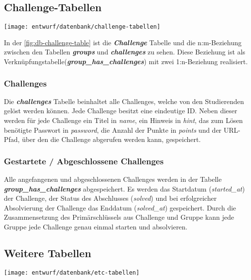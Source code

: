 \clearpage
\subsection{Challenge-Tabellen}
\begin{center}
	\texttt{[image: entwurf/datenbank/challenge-tabellen]}
	\label{fig:db-challenge-table}
\end{center}
In der \autoref{fig:db-challenge-table} ist die \textbf{\textit{Challenge}} Tabelle und die n:m-Beziehung zwischen den Tabellen \textbf{\textit{groups}} und \textbf{\textit{challenges}} zu sehen. Diese Beziehung ist als Verknüpfungstabelle\linebreak (\textbf{\textit{group\_has\_challenges}}) mit zwei 1:n-Beziehung realisiert.

\subsubsection{Challenges}
Die \textbf{\textit{challenges}} Tabelle beinhaltet alle Challenges, welche von den Studierenden gelöst werden können. Jede Challenge besitzt eine eindeutige ID. Neben dieser werden für jede Challenge ein Titel in \textit{name}, ein Hinweis in \textit{hint}, das zum Lösen benötigte Passwort in \textit{password}, die Anzahl der Punkte in \textit{points} und der URL-Pfad, über den die Challenge abgerufen werden kann, gespeichert.

\subsubsection{Gestartete / Abgeschlossene Challenges}
Alle angefangenen und abgeschlossenen Challenges werden in der Tabelle \linebreak
\textbf{\textit{group\_has\_challenges}} abgespeichert. Es werden das Startdatum (\textit{started\_at}) der Challenge, der Status des Abschlusses (\textit{solved}) und bei erfolgreicher Absolvierung der Challenge das Enddatum (\textit{solved\_at}) gespeichert. Durch die Zusammensetzung des Primärschlüssels aus Challenge und Gruppe kann jede Gruppe jede Challenge genau einmal starten und absolvieren.

\subsection{Weitere Tabellen}
\begin{center}
	\texttt{[image: entwurf/datenbank/etc-tabellen]}
	\label{fig:db-etc-table}
\end{center}


